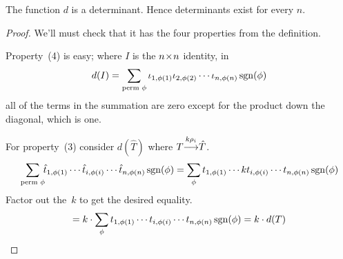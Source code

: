 \begin{lemma}
The function \( d \) is a determinant.
Hence determinants exist for every $n$.
\end{lemma}

\begin{proof}
We'll must check that it has the four properties
from the definition.

Property~(4) is easy; where $I$ is the $n \! \times \! n$ identity, in
\begin{equation*}
  d(I)=
  \sum_{\text{perm\ }\phi}
    \iota_{1,\phi(1)}\iota_{2,\phi(2)}\cdots \iota_{n,\phi(n)}
                                 \operatorname{sgn}(\phi)
\end{equation*}
all of the terms in the summation are zero
except for the product down the diagonal,
which is one.

For property~(3) consider $d(\hat{T})$ where 
\( T\smash[b]{\mathrel{ \mathop{\longrightarrow}\limits^{k\rho_i\mathstrut}_{ \begin{subarray}{l} \relax \end{subarray}}}}\hat{T} \).
\begin{equation*}
  \sum_{\text{perm\ }\phi}\!\!
    \hat{t}_{1,\phi(1)}
     \cdots\hat{t}_{i,\phi(i)}\cdots\hat{t}_{n,\phi(n)}
                                 \operatorname{sgn}(\phi)                      
  =\sum_{\phi}
     t_{1,\phi(1)}\cdots kt_{i,\phi(i)}\cdots t_{n,\phi(n)}
                                 \operatorname{sgn}(\phi)
\end{equation*}
Factor out the~\( k \) to get the desired equality.
\begin{equation*}
  =k\cdot\sum_{\phi}
     t_{1,\phi(1)}\cdots t_{i,\phi(i)}\cdots t_{n,\phi(n)}
                                 \operatorname{sgn}(\phi)                 
  =k\cdot d(T)
\end{equation*}


\end{proof}

